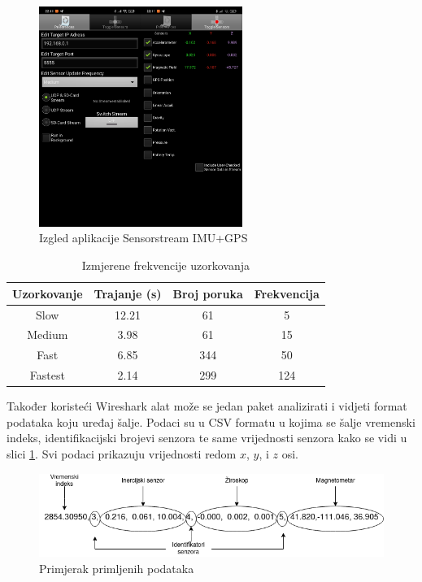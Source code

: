 \documentclass[times, utf8, diplomski]{fer}
\begin{document}
\begin{figure}
    \centering
    \includegraphics[width=250px]{app.jpg}
    \caption{Izgled aplikacije Sensorstream IMU+GPS}
\end{figure}

\begin{table} [h!]
 \centering
    \begin{tabular}{|c|c|c|c|}
        \hline
        Uzorkovanje & Trajanje (s) & Broj poruka & Frekvencija \\
        \hline
        Slow & 12.21 & 61 & 5 \\
        Medium & 3.98 & 61 & 15 \\
        Fast & 6.85 & 344 & 50 \\
        Fastest & 2.14 & 299 & 124\\
        \hline
    \end{tabular}
    \caption{Izmjerene frekvencije uzorkovanja}
    \label{frekvencije}
\end{table}

Također koristeći Wireshark alat može se jedan paket analizirati i vidjeti format podataka koju uređaj šalje. Podaci su u CSV formatu u kojima se šalje vremenski indeks,
identifikacijski brojevi senzora te same vrijednosti senzora kako se vidi u slici \ref{datagram}. Svi podaci prikazuju vrijednosti redom $x$, $y$, i $z$ osi.

\begin{figure}[h]
    \includegraphics[width=\textwidth]{datagram.png}
    \caption{Primjerak primljenih podataka}
    \label{datagram}
\end{figure}
\end{document}
